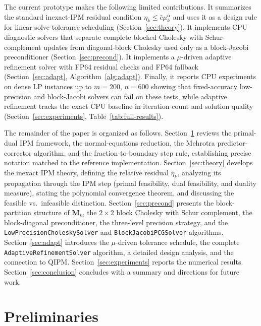 \documentclass[11pt,twoside]{article}
\newcommand{\bM}{\mathbf{M}}
\begin{document}
The current prototype makes the following limited contributions.  It
summarizes the standard inexact-IPM residual condition
$\eta_k \le \bar{c}\mu_k^\alpha$ and uses it as a design rule for
linear-solve tolerance scheduling (Section~\ref{sec:theory}).  It
implements CPU diagnostic solvers that separate complete blocked Cholesky
with Schur-complement updates from diagonal-block Cholesky used only as a
block-Jacobi preconditioner (Section~\ref{sec:precond}).  It implements a
$\mu$-driven adaptive refinement solver with FP64 residual checks and FP64
fallback (Section~\ref{sec:adapt}, Algorithm~\ref{alg:adapt}).  Finally,
it reports CPU experiments on dense LP instances up to $m=200$, $n=600$
showing that fixed-accuracy low-precision and block-Jacobi solvers can
fail on these tests, while adaptive refinement tracks the exact CPU
baseline in iteration count and solution quality
(Section~\ref{sec:experiments}, Table~\ref{tab:full-results}).

The remainder of the paper is organized as follows.  Section~\ref{sec:prelim}
reviews the primal-dual IPM framework, the normal-equations reduction, the
Mehrotra predictor-corrector algorithm, and the fraction-to-boundary step
rule, establishing precise notation matched to the reference implementation.
Section~\ref{sec:theory} develops the inexact IPM theory, defining the
relative residual $\eta_k$, analyzing its propagation through the IPM step
(primal feasibility, dual feasibility, and duality measure), stating the
polynomial convergence theorem, and discussing the feasible vs.\ infeasible
distinction.  Section~\ref{sec:precond} presents the block-partition
structure of $\bM_k$, the $2\times 2$ block Cholesky with Schur complement,
the block-diagonal preconditioner, the three-level precision strategy, and
the \texttt{LowPrecisionCholeskySolver} and
\texttt{BlockJacobiPCGSolver} algorithms.  Section~\ref{sec:adapt}
introduces the $\mu$-driven tolerance schedule, the complete
\texttt{AdaptiveRefinementSolver} algorithm, a detailed design analysis,
and the connection to QIPM.  Section~\ref{sec:experiments} reports the
numerical results.  Section~\ref{sec:conclusion} concludes with a summary
and directions for future work.

\section{Preliminaries}
\label{sec:prelim}
\end{document}

